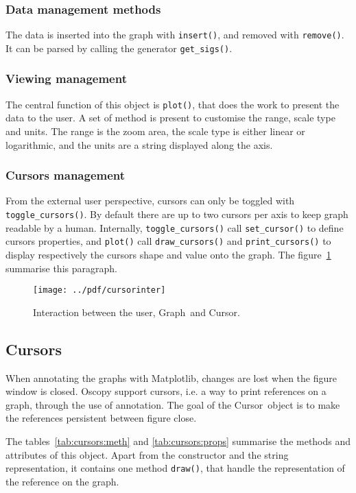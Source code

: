 \documentclass[a4paper,11pt]{article}
\newcommand{\meth}[1]{\texttt{#1()}}
\newcommand{\cls}[1]{\textsf{#1}}
\newcommand{\graph}{\cls{Graph}}
\newcommand{\cursor}{\cls{Cursor}}
\begin{document}
\subsubsection{Data management methods}
The data is inserted into the graph with \meth{insert}, and removed with \meth{remove}.
It can be parsed by calling the generator \meth{get\_sigs}.

\subsubsection{Viewing management}
The central function of this object is \meth{plot}, that does the work to present the data to the user.
A set of method is present to customise the range, scale type and units.
The range is the zoom area, the scale type is either linear or logarithmic, and the units are a string displayed along the axis.

\subsubsection{Cursors management}
From the external user perspective, cursors can only be toggled with \meth{toggle\_cursors}.
By default there are up to two cursors per axis to keep graph readable by a human.
Internally, \meth{toggle\_cursors} call \meth{set\_cursor} to define cursors properties, and \meth{plot} call \meth{draw\_cursors} and \meth{print\_cursors} to display respectively the cursors shape and value onto the graph.
The figure~\ref{fig:cursorinter} summarise this paragraph.

\begin{figure}[htbp]
  \centering
  \texttt{[image: ../pdf/cursorinter]}
  \caption{Interaction between the user, \graph\ and \cursor.}
  \label{fig:cursorinter}
\end{figure}

\subsection{Cursors}
\label{sec:curs}
When annotating the graphs with Matplotlib, changes are lost when the figure window is closed.
Oscopy support cursors, i.e. a way to print references on a graph, through the use of annotation.
The goal of the \cursor\ object is to make the references persistent between figure close.

The tables~\ref{tab:cursors:meth} and \ref{tab:cursors:props} summarise the methods and attributes of this object.
Apart from the constructor and the string representation, it contains one method \meth{draw}, that handle the representation of the reference on the graph.
\end{document}
